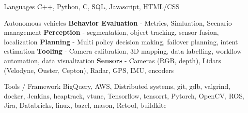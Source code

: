 \vspace{-3mm}

\begin{cvskills}

  \cvskill
    {Languages} %
    {C++, Python, C, SQL, Javascript, HTML/CSS} %

  \cvskill
	{Autonomous vehicles} %
	{\textbf{Behavior Evaluation} - Metrics, Simluation, Scenario management\linebreak
	\textbf{Perception} - segmentation, object tracking, sensor fusion, localization\linebreak
	\textbf{Planning} - Multi policy decision making, failover planning, intent estimation\linebreak
	\textbf{Tooling} - Camera calibration, 3D mapping, data labelling, workflow automation, data visualization\linebreak
	\textbf{Sensors} - Cameras (RGB, depth), Lidars (Velodyne, Ouster, Cepton), Radar, GPS, IMU, encoders} %

	\cvskill
	{Tools / Framework} %
	{BigQuery, AWS, Distributed systems, git, gdb, valgrind, docker, Jenkins, heaptrack, vtune, Tensorflow, tensorrt, Pytorch, OpenCV, ROS, Jira, Databricks, linux, bazel, mason, Retool, buildkite} %
\end{cvskills}
